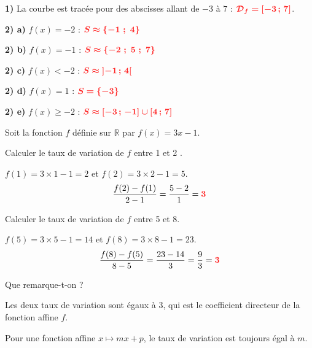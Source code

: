 \documentclass[11pt,a4paper]{article}  %
\begin{document}
	\begin{corrBox}
		\textbf{1)} La courbe est tracée pour des abscisses allant de $-3$ à $7$ : $\mRouge{\mathcal{D}_f=[-3\,;\,7]}$.
	\end{corrBox}
	
	\begin{corrBox}
		\textbf{2) a)} $f(x)=-2$ : $\mRouge{S\approx\{-1\ ;\ 4\}}$
	\end{corrBox}
	
	\begin{corrBox}
		\textbf{2) b)} $f(x)=-1$ : $\mRouge{S\approx\{-2\ ;\ 5\ ;\ 7\}}$
	\end{corrBox}
	
	\begin{corrBox}
		\textbf{2) c)} $f(x)<-2$ : $\mRouge{S\approx\left]-1\,;\,4\right[}$
	\end{corrBox}
	
	\begin{corrBox}
		\textbf{2) d)} $f(x)=1$ : $\mRouge{S=\{-3\}}$
	\end{corrBox}
	
	\begin{corrBox}
		\textbf{2) e)} $f(x)\geqslant-2$ : $\mRouge{S\approx\left[-3\,;\,-1\right]\cup\left[4\,;\,7\right]}$
	\end{corrBox}
	
	
	Soit la fonction $f$ définie sur $\mathbb{R}$ par $f(x)=3 x-1$.
	\begin{enumMet}
		\item Calculer le taux de variation de $f$ entre 1 et 2 .
		\begin{corrBox}
			$f(1)=3\times1-1=2$ et $f(2)=3\times2-1=5$.
			\[\dfrac{f(2)-f(1)}{2-1}=\dfrac{5-2}{1}=\mRouge{3}\]
		\end{corrBox}
		
		\item Calculer le taux de variation de $f$ entre 5 et 8.
		\begin{corrBox}
			$f(5)=3\times5-1=14$ et $f(8)=3\times8-1=23$.
			\[\dfrac{f(8)-f(5)}{8-5}=\dfrac{23-14}{3}=\dfrac{9}{3}=\mRouge{3}\]
		\end{corrBox}
		
		\item Que remarque-t-on ?
		\begin{corrBox}
			Les deux taux de variation sont égaux à $3$, qui est le coefficient directeur de la fonction affine $f$.
			
			Pour une fonction affine $x\mapsto mx+p$, le taux de variation est toujours égal à $m$.
		\end{corrBox}
	\end{enumMet}
	
\end{document}

